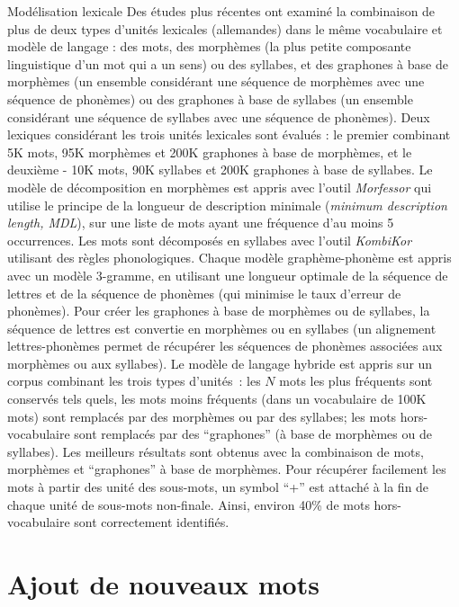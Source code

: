 \documentclass{style/these}
\let\oldcite=\cite
\renewcommand{\cite}[1]{{\fontfamily{qcs}\selectfont{\color{darkerblue}[\oldcite{#1}]}}}
\begin{document}
\begin{part}{Modélisation lexicale}
Des études plus récentes \cite{Shaik:2011_2} ont examiné la combinaison de plus de deux types d'unités lexicales (allemandes) dans le même vocabulaire et modèle de langage : des mots, des morphèmes (la plus petite composante linguistique d'un mot qui a un sens) ou des syllabes, et des graphones à base de morphèmes (un ensemble considérant une séquence de morphèmes avec une séquence de phonèmes) ou des graphones à base de syllabes (un ensemble considérant une séquence de syllabes avec une séquence de phonèmes). 
Deux lexiques considérant les trois unités lexicales sont évalués : le premier combinant 5K mots, 95K morphèmes et 200K graphones à base de morphèmes, et le deuxième - 10K mots, 90K syllabes et 200K graphones à base de syllabes.  
Le modèle de décomposition en morphèmes est appris avec l'outil \textit{Morfessor} qui utilise le principe de la longueur de description minimale (\textit{minimum description length, MDL}), sur une liste de mots ayant une fréquence d'au moins 5 occurrences.  
Les mots sont décomposés en syllabes avec l'outil \textit{KombiKor} utilisant des règles phonologiques. 
Chaque modèle graphème-phonème est appris avec un modèle 3-gramme, en utilisant une longueur optimale de la séquence de lettres et de la séquence de phonèmes (qui minimise le taux d'erreur de phonèmes). Pour créer les graphones à base de morphèmes ou de syllabes, la séquence de lettres est convertie en morphèmes ou en syllabes (un alignement lettres-phonèmes permet de récupérer les séquences de phonèmes associées aux morphèmes ou aux syllabes).  
Le modèle de langage hybride est appris sur un corpus combinant les trois types d'unités~: les $N$ mots les plus fréquents sont conservés tels quels, les mots moins fréquents (dans un vocabulaire de 100K mots) sont remplacés par des morphèmes ou par des syllabes; les mots hors-vocabulaire sont remplacés par des ``graphones'' (à base de morphèmes ou de syllabes). 
Les meilleurs résultats sont obtenus avec la combinaison de mots, morphèmes et ``graphones'' à base de morphèmes. 
Pour récupérer facilement les mots à partir des unité des sous-mots, un symbol ``+'' est attaché à la fin de chaque unité de sous-mots non-finale. Ainsi, environ 40\% de mots hors-vocabulaire sont correctement identifiés. 


\section{Ajout de nouveaux mots}
\renewcommand{\rightmark}{Ajout de nouveaux mots}


\end{part}
\end{document}
